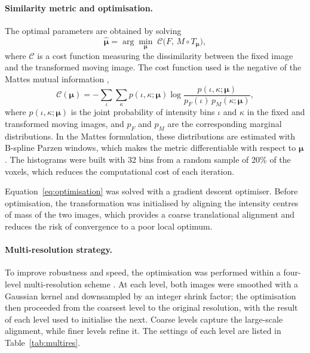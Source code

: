 \paragraph{Similarity metric and optimisation.}  %

The optimal parameters are obtained by solving
\begin{equation}
  \hat{\boldsymbol{\mu}} = \arg\min_{\boldsymbol{\mu}} \;
  \mathcal{C}\big(F,\, M \circ T_{\boldsymbol{\mu}}\big),
  \label{eq:optimisation}        %
\end{equation}
where $\mathcal{C}$ is a cost function measuring the dissimilarity between the
fixed image and the transformed moving image. The cost function used is the
negative of the Mattes mutual information \cite{mattes2003petct},
\begin{equation}
  \mathcal{C}(\boldsymbol{\mu}) = -\sum_{\iota}\sum_{\kappa} p(\iota,\kappa;\boldsymbol{\mu})
  \log \frac{p(\iota,\kappa;\boldsymbol{\mu})}{p_F(\iota)\, p_M(\kappa;\boldsymbol{\mu})},
  \label{eq:mattes}              %
\end{equation}
where $p(\iota,\kappa;\boldsymbol{\mu})$ is the joint probability of intensity
bins $\iota$ and $\kappa$ in the fixed and transformed moving images, and $p_F$
and $p_M$ are the corresponding marginal distributions. In the Mattes
formulation, these distributions are estimated with B-spline Parzen windows,
which makes the metric differentiable with respect to $\boldsymbol{\mu}$. The
histograms were built with 32 bins from a random sample of 20\% of the voxels,
which reduces the computational cost of each iteration.

Equation~\eqref{eq:optimisation} was solved with a gradient descent optimiser.
Before optimisation, the transformation was initialised by aligning the
intensity centres of mass of the two images, which provides a coarse
translational alignment and reduces the risk of convergence to a poor local
optimum.

\paragraph{Multi-resolution strategy.}  %

To improve robustness and speed, the optimisation was performed within a
four-level multi-resolution scheme \cite{thevenaz1998pyramid}. At each level,
both images were smoothed with a Gaussian kernel and downsampled by an integer
shrink factor; the optimisation then proceeded from the coarsest level to the
original resolution, with the result of each level used to initialise the next.
Coarse levels capture the large-scale alignment, while finer levels refine it.
The settings of each level are listed in Table~\ref{tab:multires}.

